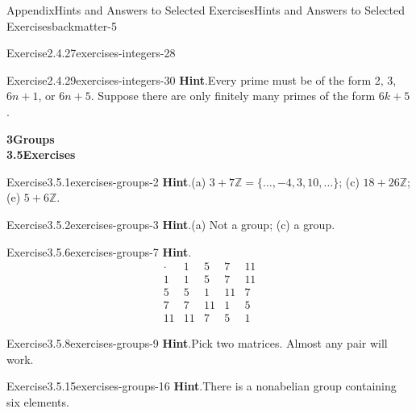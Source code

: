 \documentclass[oneside,10pt,]{book}
\newcommand{\blocktitlefont}{\relax}
\numberwithin{equation}{section}
\begin{document}
\begin{solutions-chapter}{Appendix}{Hints and Answers to Selected Exercises}{}{Hints and Answers to Selected Exercises}{}{}{backmatter-5}
\begin{divisionsolution}{Exercise}{2.4.27}{}{exercises-integers-28}
\end{divisionsolution}%
\begin{divisionsolution}{Exercise}{2.4.29}{}{exercises-integers-30}%
\noindent\textbf{\blocktitlefont Hint}.\hypertarget{exercises-integers-30-2-back}{}\quad{}Every prime must be of the form 2, 3, \(6n + 1\), or \(6n + 5\).   Suppose there are only finitely many primes of the form \(6k + 5\).%
\end{divisionsolution}%
\par\medskip
\noindent\textbf{\Large{}3\space\textperiodcentered\space{}Groups\\
3.5\space\textperiodcentered\space{}Exercises}
\begin{divisionsolution}{Exercise}{3.5.1}{}{exercises-groups-2}%
\noindent\textbf{\blocktitlefont Hint}.\hypertarget{exercises-groups-2-2-back}{}\quad{}(a) \(3 + 7 \mathbb Z = \{ \ldots, -4, 3, 10, \ldots \}\);  (c) \(18 + 26 \mathbb Z\);  (e) \(5 + 6 \mathbb Z\).%
\end{divisionsolution}%
\begin{divisionsolution}{Exercise}{3.5.2}{}{exercises-groups-3}%
\noindent\textbf{\blocktitlefont Hint}.\hypertarget{exercises-groups-3-2-back}{}\quad{}(a) Not a group; (c) a group.%
\end{divisionsolution}%
\begin{divisionsolution}{Exercise}{3.5.6}{}{exercises-groups-7}%
\noindent\textbf{\blocktitlefont Hint}.\hypertarget{exercises-groups-7-2-back}{}\quad{}%
\begin{equation*}
\begin{array}{c|cccc}
\cdot & 1  & 5  & 7  & 11 \\
\hline
1 & 1 & 5 & 7 & 11 \\ 5 & 5 & 1 & 11 & 7 \\
7 & 7 & 11 & 1 & 5 \\ 11 & 11 & 7 & 5 & 1
\end{array}
\end{equation*}
%
\end{divisionsolution}%
\begin{divisionsolution}{Exercise}{3.5.8}{}{exercises-groups-9}%
\noindent\textbf{\blocktitlefont Hint}.\hypertarget{exercises-groups-9-2-back}{}\quad{}Pick two matrices. Almost any pair will work.%
\end{divisionsolution}%
\begin{divisionsolution}{Exercise}{3.5.15}{}{exercises-groups-16}%
\noindent\textbf{\blocktitlefont Hint}.\hypertarget{exercises-groups-16-2-back}{}\quad{}There is a nonabelian group containing six elements.%

\end{divisionsolution}
\end{solutions-chapter}
\end{document}

